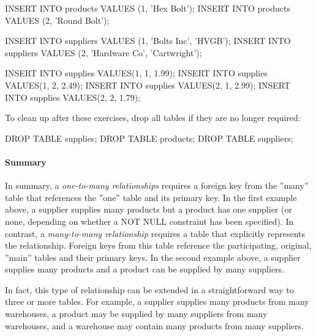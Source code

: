 \begin{samepage}
\begin{sqlcode}
INSERT INTO products VALUES (1, 'Hex Bolt');
INSERT INTO products VALUES (2, 'Round Bolt');

INSERT INTO suppliers VALUES (1, 'Bolts Inc', 'HVGB');
INSERT INTO suppliers VALUES (2, 'Hardware Co', 'Cartwright');

INSERT INTO supplies VALUES(1, 1, 1.99);
INSERT INTO supplies VALUES(1, 2, 2.49);
INSERT INTO supplies VALUES(2, 1, 2.99);
INSERT INTO supplies VALUES(2, 2, 1.79);
\end{sqlcode}
\end{samepage}

\noindent To clean up after these exercises, drop all tables if they are no longer required:

\begin{samepage}
\begin{sqlcode}
DROP TABLE supplies;
DROP TABLE products;
DROP TABLE suppliers;
\end{sqlcode}
\end{samepage}


\paragraph*{Summary} In summary, a \emph{one-to-many relationships} requires a foreign key from the ''many'' table that references the ''one'' table and its primary key. In the first example above, a supplier supplies many products but a product has one supplier (or none, depending on whether a NOT NULL constraint has been specified). In contrast, a \emph{many-to-many relationship} requires a table that explicitly represents the relationship. Foreign keys from this table reference the participating, original, ''main'' tables and their primary keys. In the second example above, a supplier supplies many products and a product can be supplied by many suppliers. 

In fact, this type of relationship can be extended in a straightforward way to three or more tables. For example, a supplier supplies many products from many warehouses, a product may be supplied by many suppliers from many warehouses, and a warehouse may contain many products from many suppliers. 


